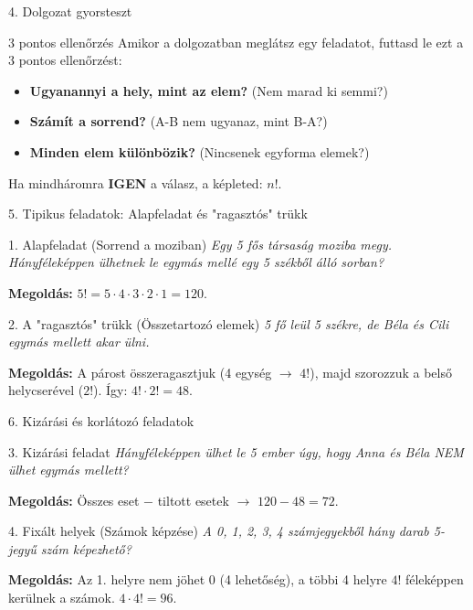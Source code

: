 \documentclass[aspectratio=169,11pt]{beamer}
\begin{document}
\begin{frame}{4. Dolgozat gyorsteszt}
    \begin{exampleblock}{3 pontos ellenőrzés}
        Amikor a dolgozatban meglátsz egy feladatot, futtasd le ezt a 3 pontos ellenőrzést:
        \begin{itemize}
            \item \textbf{Ugyanannyi a hely, mint az elem?} (Nem marad ki semmi?)
            \item \textbf{Számít a sorrend?} (A-B nem ugyanaz, mint B-A?)
            \item \textbf{Minden elem különbözik?} (Nincsenek egyforma elemek?)
        \end{itemize}
        Ha mindháromra \textbf{IGEN} a válasz, a képleted: $n!$.
    \end{exampleblock}
\end{frame}

\begin{frame}{5. Tipikus feladatok: Alapfeladat és "ragasztós" trükk}
    \begin{block}{1. Alapfeladat (Sorrend a moziban)}
        \textit{Egy 5 fős társaság moziba megy. Hányféleképpen ülhetnek le egymás mellé egy 5 székből álló sorban?}
        
        \textbf{Megoldás:} $5! = 5 \cdot 4 \cdot 3 \cdot 2 \cdot 1 = 120$.
    \end{block}

    \begin{block}{2. A "ragasztós" trükk (Összetartozó elemek)}
        \textit{5 fő leül 5 székre, de Béla és Cili egymás mellett akar ülni.}
        
        \textbf{Megoldás:} A párost összeragasztjuk (4 egység $\rightarrow$ $4!$), majd szorozzuk a belső helycserével ($2!$). Így: $4! \cdot 2! = 48$.
    \end{block}
\end{frame}

\begin{frame}{6. Kizárási és korlátozó feladatok}
    \begin{block}{3. Kizárási feladat}
        \textit{Hányféleképpen ülhet le 5 ember úgy, hogy Anna és Béla NEM ülhet egymás mellett?}
        
        \textbf{Megoldás:} Összes eset $-$ tiltott esetek $\rightarrow$ $120 - 48 = 72$.
    \end{block}

    \begin{block}{4. Fixált helyek (Számok képzése)}
        \textit{A 0, 1, 2, 3, 4 számjegyekből hány darab 5-jegyű szám képezhető?}
        
        \textbf{Megoldás:} Az 1. helyre nem jöhet 0 (4 lehetőség), a többi 4 helyre $4!$ féleképpen kerülnek a számok. $4 \cdot 4! = 96$.
    \end{block}
\end{frame}
\end{document}
